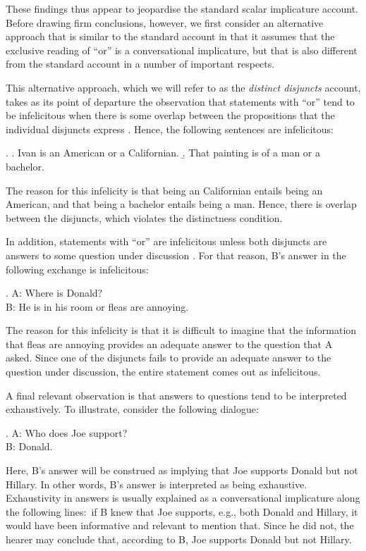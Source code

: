 \documentclass[12pt]{article}
\begin{document}
These findings thus appear to jeopardise the standard scalar implicature account. Before drawing firm conclusions, however, we first consider an alternative approach that is similar to the standard account in that it assumes that the exclusive reading of ``or'' is a conversational implicature, but that is also different from the standard account in a number of important respects.

This alternative approach, which we will refer to as the \emph{distinct disjuncts} account, takes as its point of departure the observation that statements with ``or'' tend to be infelicitous when there is some overlap between the propositions that the individual disjuncts express \citep{hurford1974, simons2001, ZimmermannFreeChoiceDisjunction2000}. Hence, the following sentences are infelicitous:

\ex.	\a. \label{ex:hurford} Ivan is an American or a Californian.
	\b. That painting is of a man or a bachelor.
	
The reason for this infelicity is that being an Californian entails being an American, and that being a bachelor entails being a man. Hence, there is overlap between the disjuncts, which violates the distinctness condition.

In addition, statements with ``or'' are infelicitous unless both disjuncts are answers to some question under discussion \citep{simons2001}. For that reason, B's answer in the following exchange is infelicitous:

\ex.	A: Where is Donald? \\ B: He is in his room or fleas are annoying.

The reason for this infelicity is that it is difficult to imagine that the information that fleas are annoying provides an adequate answer to the question that A asked. Since one of the disjuncts fails to provide an adequate answer to the question under discussion, the entire statement comes out as infelicitous.

A final relevant observation is that answers to questions tend to be interpreted exhaustively. To illustrate, consider the following dialogue:

\ex.	A: Who does Joe support? \\ B: Donald.

Here, B's answer will be construed as implying that Joe supports Donald but not Hillary. In other words, B's answer is interpreted as being exhaustive. Exhaustivity in answers is usually explained as a conversational implicature along the following lines:\ if B knew that Joe supports, e.g., both Donald and Hillary, it would have been informative and relevant to mention that. Since he did not, the hearer may conclude that, according to B, Joe supports Donald but not Hillary.
\end{document}
